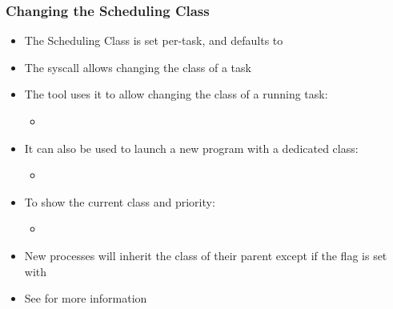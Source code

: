 \begin{frame}
        \frametitle{Changing the Scheduling Class}
        \begin{itemize}
                \item The Scheduling Class is set per-task, and defaults to 
                \item The  syscall allows changing the class of a task
                \item The  tool uses it to allow changing the class of a running task:
                        \begin{itemize}
                                \item {}
                        \end{itemize}
                \item It can also be used to launch a new program with a dedicated class:
                        \begin{itemize}
                                \item {}
                        \end{itemize}
                \item To show the current class and priority:
                        \begin{itemize}
                                \item {}
                        \end{itemize}
                \item New processes will inherit the class of their parent except if the  flag is set with 
                \item See  for more information
        \end{itemize}
\end{frame}
